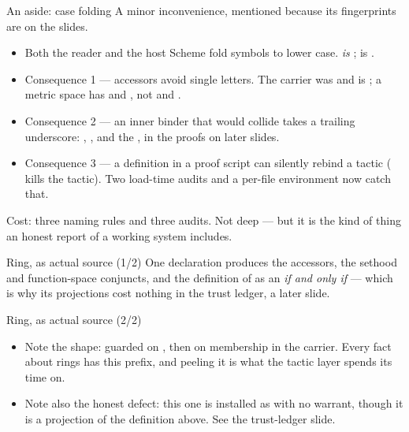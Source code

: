 \documentclass[11pt,aspectratio=169]{beamer}
\begin{document}
\begin{frame}{An aside: case folding}
  A minor inconvenience, mentioned because its fingerprints are on the slides.
  \begin{itemize}
    \item Both the \vnb{} reader and the host Scheme fold symbols to lower
          case.  \emph{is} ;  is .
    \item Consequence 1 --- accessors avoid single letters. The carrier was
           and is ; a metric space has  and
          , not  and .
    \item Consequence 2 --- an inner binder that would collide takes a trailing
          underscore: , , and the , 
          in the proofs on later slides.
    \item Consequence 3 --- a definition in a proof script can silently rebind
          a tactic ( kills the  tactic). Two
          load-time audits and a per-file environment now catch that.
  \end{itemize}
  \vfill
  \small Cost: three naming rules and three audits. Not deep --- but it is the
  kind of thing an honest report of a working system includes.
\end{frame}

\begin{frame}[fragile]{Ring, as actual source (1/2)}
  \vspace{-0.5ex}
  \small
  One declaration produces the accessors, the sethood and function-space
  conjuncts, and the definition of  as an
  \emph{if and only if} --- which is why its projections cost nothing in the
  trust ledger, a later slide.
\end{frame}

\begin{frame}[fragile]{Ring, as actual source (2/2)}
  \vspace{-0.5ex}
  \small
  \begin{itemize}
    \item Note the shape: guarded on , then on membership in the
          carrier. Every fact about rings has this prefix, and peeling it is
          what the tactic layer spends its time on.
    \item Note also the honest defect: this one is installed as
           with no warrant, though it is a projection of the
          definition above. See the trust-ledger slide.
  \end{itemize}
\end{frame}
\end{document}
